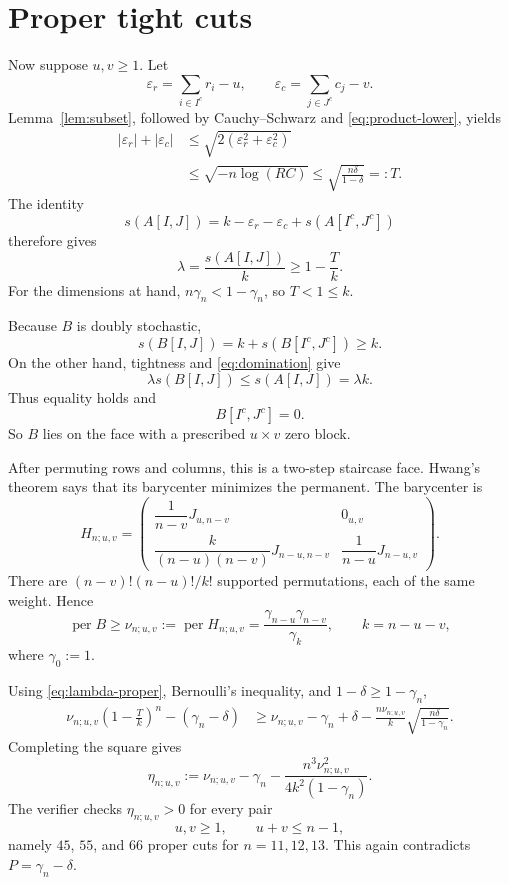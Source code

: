 \documentclass[11pt]{article}
\theoremstyle{remark}
\newcommand{\per}{\operatorname{per}}
\begin{document}
\section{Proper tight cuts}
Now suppose $u,v\ge1$. Let
\[
 \varepsilon_r=\sum_{i\in I^c}r_i-u,
 \qquad
 \varepsilon_c=\sum_{j\in J^c}c_j-v.
\]
Lemma~\ref{lem:subset}, followed by Cauchy--Schwarz and \eqref{eq:product-lower}, yields
\begin{align}
 |\varepsilon_r|+|\varepsilon_c|
 &\le\sqrt{2(\varepsilon_r^2+\varepsilon_c^2)}\\
 &\le\sqrt{-n\log(RC)}
 \le\sqrt{\frac{n\delta}{1-\delta}}
 =:T.
\end{align}
The identity
\begin{equation}\label{eq:cut-identity}
 s(A[I,J])
 =k-\varepsilon_r-\varepsilon_c+s(A[I^c,J^c])
\end{equation}
therefore gives
\begin{equation}\label{eq:lambda-proper}
 \lambda=\frac{s(A[I,J])}{k}\ge1-\frac{T}{k}.
\end{equation}
For the dimensions at hand, $n\gamma_n<1-\gamma_n$, so $T<1\le k$.

Because $B$ is doubly stochastic,
\[
 s(B[I,J])=k+s(B[I^c,J^c])\ge k.
\]
On the other hand, tightness and \eqref{eq:domination} give
\[
 \lambda s(B[I,J])\le s(A[I,J])=\lambda k.
\]
Thus equality holds and
\begin{equation}\label{eq:forced-zero-block}
 B[I^c,J^c]=0.
\end{equation}
So $B$ lies on the face with a prescribed $u\times v$ zero block.

After permuting rows and columns, this is a two-step staircase face. Hwang's theorem says that its barycenter minimizes the permanent. The barycenter is
\begin{equation}\label{eq:stair-bary}
 H_{n;u,v}=
 \begin{pmatrix}
 \dfrac1{n-v}J_{u,n-v}&0_{u,v}\\[2mm]
 \dfrac{k}{(n-u)(n-v)}J_{n-u,n-v}&
 \dfrac1{n-u}J_{n-u,v}
 \end{pmatrix}.
\end{equation}
There are $(n-v)!(n-u)!/k!$ supported permutations, each of the same weight. Hence
\begin{equation}\label{eq:nu}
 \per B\ge\nu_{n;u,v}:=\per H_{n;u,v}
 =\frac{\gamma_{n-u}\gamma_{n-v}}{\gamma_k},
 \qquad k=n-u-v,
\end{equation}
where $\gamma_0:=1$.

Using \eqref{eq:lambda-proper}, Bernoulli's inequality, and $1-\delta\ge1-\gamma_n$,
\begin{align}
 \nu_{n;u,v}\left(1-\frac Tk\right)^n-(\gamma_n-\delta)
 &\ge \nu_{n;u,v}-\gamma_n+\delta
 -\frac{n\nu_{n;u,v}}k
 \sqrt{\frac{n\delta}{1-\gamma_n}}.
\end{align}
Completing the square gives
\begin{equation}\label{eq:eta-proper}
 \eta_{n;u,v}:=
 \nu_{n;u,v}-\gamma_n-
 \frac{n^3\nu_{n;u,v}^2}{4k^2(1-\gamma_n)}.
\end{equation}
The verifier checks $\eta_{n;u,v}>0$ for every pair
\[
 u,v\ge1,\qquad u+v\le n-1,
\]
namely $45$, $55$, and $66$ proper cuts for $n=11,12,13$. This again contradicts $P=\gamma_n-\delta$.
\end{document}
